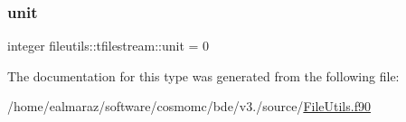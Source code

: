 \subsubsection{\texorpdfstring{unit}{unit}}
{\footnotesize\ttfamily integer fileutils\+::tfilestream\+::unit = 0\hspace{0.3cm}{\ttfamily [private]}}



The documentation for this type was generated from the following file\+:\begin{DoxyCompactItemize}
\item 
/home/ealmaraz/software/cosmomc/bde/v3./source/\mbox{\hyperlink{FileUtils_8f90}{File\+Utils.\+f90}}\end{DoxyCompactItemize}
